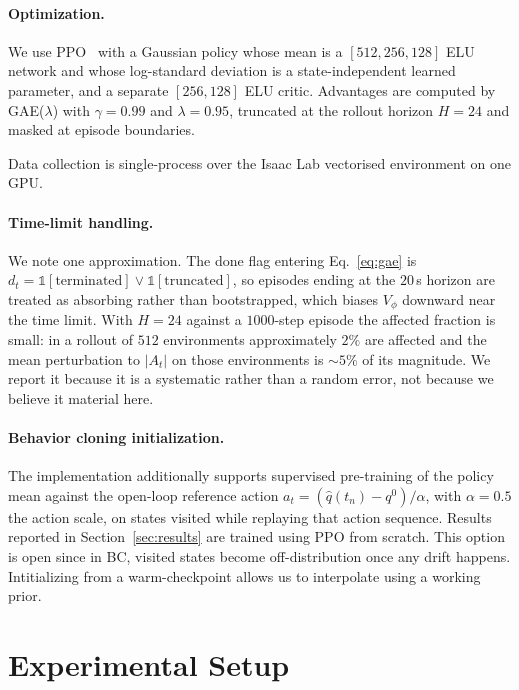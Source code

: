\documentclass{article}
\theoremstyle{plain}
\theoremstyle{definition}
\theoremstyle{remark}
\begin{document}
\paragraph{Optimization.} We use PPO~\citep{schulman2017ppo} with a Gaussian
policy whose mean is a $[512, 256, 128]$ ELU network and whose log-standard
deviation is a state-independent learned parameter, and a separate
$[256, 128]$ ELU critic. Advantages are computed by GAE($\lambda$) with
$\gamma = 0.99$ and $\lambda = 0.95$, truncated at the rollout horizon
$H = 24$ and masked at episode boundaries.

Data collection is single-process over the Isaac Lab vectorised environment on
one GPU.
 
\paragraph{Time-limit handling.} We note one approximation. The done flag
entering Eq.~\eqref{eq:gae} is $d_t = \mathbb{1}[\text{terminated}] \vee
\mathbb{1}[\text{truncated}]$, so episodes ending at the $20$\,s horizon are
treated as absorbing rather than bootstrapped, which biases $V_\phi$ downward
near the time limit. With $H = 24$ against a $1000$-step episode the affected
fraction is small: in a rollout of $512$ environments approximately $2\%$ are
affected and the mean perturbation to $|A_t|$ on those environments is
$\sim\!5\%$ of its magnitude. We report it because it is a systematic rather
than a random error, not because we believe it material here.
 
\paragraph{Behavior cloning initialization.} The implementation additionally
supports supervised pre-training of the policy mean against the open-loop
reference action $a_t = (\hat{q}(t_n) - q^{0})/\alpha$, with $\alpha = 0.5$ the
action scale, on states visited while replaying that action sequence. Results
reported in Section~\ref{sec:results} are trained using PPO from scratch. This option is open since in BC, visited states become off-distribution once any drift happens. Intitializing from a warm-checkpoint allows us to interpolate using a working prior.


\section{Experimental Setup}
\label{sec:experiments}
\end{document}
